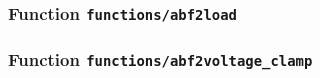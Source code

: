 \subsubsection[Function \texttt{abf2load}]{Function \texttt{functions/abf2load}}%
%
\label{ref_functions__abf2load}%
\hypertarget{ref_functions__abf2load}{}%
\begin{description}
%
%
%
%
%
%
%
%
\end{description}
\methodline%
\subsubsection[Function \texttt{abf2voltage\_clamp}]{Function \texttt{functions/abf2voltage\_clamp}}%
%
\label{ref_functions__abf2voltage_clamp}%
\hypertarget{ref_functions__abf2voltage_clamp}{}%
